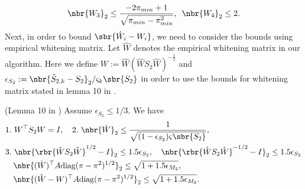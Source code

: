 \documentclass[twoside,11pt]{article}
\begin{document}
{\begin{align}
\label{eq:W3bounds}
\nbr{ W_3}_2  \leq \frac{-2\pi_{min}+1}{\sqrt{\pi_{min}-\pi_{min}^2}},\,\,\, \nbr{W_4}_2 \leq 2.
\end{align}
Next, in order to bound $\sbr{\hat{W}_i - W_i}$, we need to consider the bounds using empirical whitening matrix.
Let $\hat{W}$ denotes the empirical whitening matrix in our algorithm. Here we define $W := \hat{W}(\hat{W}S_2\hat{W})^{-\frac{1}{2}}$ and $\epsilon_{S_2} := \nbr{\hat{S}_{2,k} - S_2}_2/\varsigma_k \sbr{S_2}$ in order to use the bounds for whitening matrix stated in lemma 10 in \cite{HsuKak12}.
\begin{lemma}{(Lemma 10 in \cite{HsuKak12})} 
  \label{lem:whiten}
Assume $\epsilon_{S_2} \leq 1/3.$ We have
  \begin{align*}
    &1.\,\, W^\top S_2W=I, \,\,\,\,\,\, 2.\,\, \nbr{\hat{W}}_2 \leq \frac{1}{\sqrt{(1-\epsilon_{S_2}) \varsigma \sbr{S_2} }},\\
    &3.\,\, \nbr{\rbr{\hat{W}S_2\hat{W}}^{1/2}-I }_2 \leq 1.5 \epsilon_{S_2},   \,\,\,\,\,\,\nbr{\rbr{\hat{W}S_2\hat{W}}^{-1/2}-I }_2 \leq 1.5 \epsilon_{S_2}\\
    &  \,\,\,\,\,\,\nbr{(\hat{W})^\top A\mathrm{diag}(\pi-\pi^2)^{1/2}}_2 \leq \sqrt{1+1.5 \epsilon_{M_2}}, \\
    & \,\,\,\,\,\, \nbr{(\hat{W}-W)^\top A\mathrm{diag}(\pi-\pi^2)^{1/2}}_2 \leq \sqrt{1+1.5 \epsilon_{M_2}}.
  \end{align*}

\end{lemma} 

}
\end{document}
